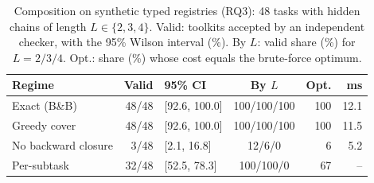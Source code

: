 \begin{table}[t]
\caption{Composition on synthetic typed registries (RQ3): 48 tasks with hidden chains of length $L\in\{2,3,4\}$.
Valid: toolkits accepted by an independent checker, with the 95\% Wilson interval (\%). By $L$: valid share
(\%) for $L=2/3/4$. Opt.: share (\%) whose cost equals the brute-force optimum.}
\label{tab:eval-composition}
\centering\footnotesize\setlength{\tabcolsep}{2.0pt}
\begin{tabular}{@{}lrlcrr@{}}
\toprule
Regime & Valid & 95\% CI & By $L$ & Opt. & ms\\
\midrule
Exact (B\&B) & 48/48 & [92.6, 100.0] & 100/100/100 & 100 & 12.1 \\
Greedy cover & 48/48 & [92.6, 100.0] & 100/100/100 & 100 & 11.5 \\
No backward closure & 3/48 & [2.1, 16.8] & 12/6/0 & 6 & 5.2 \\
Per-subtask & 32/48 & [52.5, 78.3] & 100/100/0 & 67 & -- \\
\bottomrule
\end{tabular}
\end{table}
